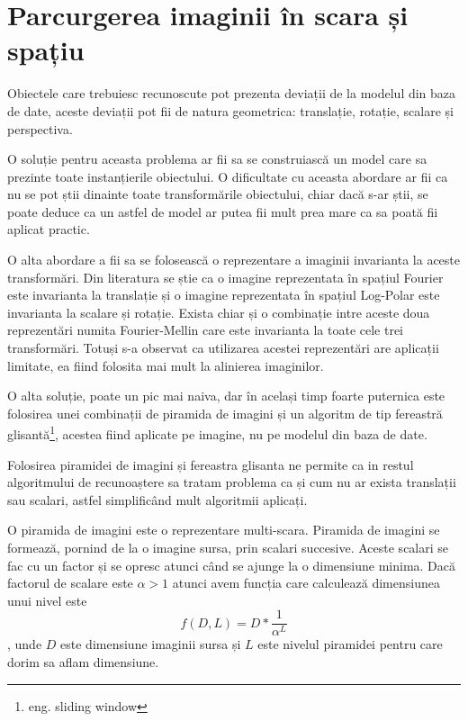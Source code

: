\pagebreak
\section{Parcurgerea imaginii în scara și spațiu}

Obiectele care trebuiesc recunoscute pot prezenta deviații de la modelul din baza de date, aceste deviații pot fii de natura geometrica: translație, rotație, scalare și perspectiva.

O soluție pentru aceasta problema ar fii sa se construiască un model care sa prezinte toate instanțierile obiectului.
O dificultate cu aceasta abordare ar fii ca nu se pot știi dinainte toate transformările obiectului, chiar dacă s-ar știi, se poate deduce ca un astfel de model ar putea fii mult prea mare ca sa poată fii aplicat practic.

O alta abordare a fii sa se folosească o reprezentare a imaginii invarianta la aceste transformări.
Din literatura se știe ca o imagine reprezentata în spațiul Fourier este invarianta la translație și o imagine reprezentata în spațiul Log-Polar este invarianta la scalare și rotație.
Exista chiar și o combinație intre aceste doua reprezentări numita Fourier-Mellin care este invarianta la toate cele trei transformări.
Totuși s-a observat ca utilizarea acestei reprezentări are aplicații limitate, ea fiind folosita mai mult la alinierea imaginilor.

O alta soluție, poate un pic mai naiva, dar în același timp foarte puternica este folosirea unei combinații de piramida de imagini și un algoritm de tip fereastră glisantă\footnote{eng. sliding window}, acestea fiind aplicate pe imagine, nu pe modelul din baza de date.

Folosirea piramidei de imagini și fereastra glisanta ne permite ca in restul algoritmului de recunoaștere sa tratam problema ca și cum nu ar exista translații sau scalari, astfel simplificând mult algoritmii aplicați.

O piramida de imagini este o reprezentare multi-scara.
Piramida de imagini se formează, pornind de la o imagine sursa, prin scalari succesive.
Aceste scalari se fac cu un factor și se opresc atunci când se ajunge la o dimensiune minima.
Dacă factorul de scalare este ${\alpha > 1}$ atunci avem funcția care calculează dimensiunea unui nivel este  
$${ f(D,L) = D * \frac{1}{\alpha^L} }$$, unde ${D}$ este dimensiune imaginii sursa și ${L}$ este nivelul piramidei pentru care dorim sa aflam dimensiune.

